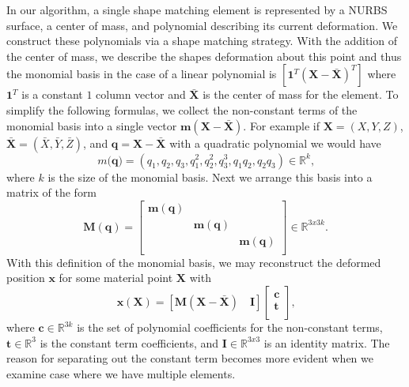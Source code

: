 In our algorithm, a single shape matching element is represented by a NURBS surface, a center of mass, and polynomial describing its current deformation. We construct these polynomials via a shape matching strategy. With the addition of the center of mass, we describe the shapes deformation about this point and thus the monomial basis in the case of a linear polynomial is $\left[ \mathbf 1^T (\mathbf{X - \bar{X}})^T \right]$ where $\mathbf 1^T$ is a constant $1$ column vector and $\mathbf{\bar{X}}$ is the center of mass for the element. To simplify the following formulas, we collect the non-constant terms of the monomial basis into a single vector $\mathbf{m}(\mathbf{X}-\mathbf{\bar{X}})$. For example if $\mathbf{X} = (X,Y,Z)$, $\mathbf{\bar{X}} = (\bar X, \bar Y, \bar Z)$, and $\mathbf{q}=\mathbf{X}-\mathbf{\bar{X}}$ with a quadratic polynomial we would have
\begin{equation}
m(\mathbf{q)} = (
					q_1, q_2, q_3,
                   	q_1^2, q_2^2, q_3^3,
                   	q_1 q_2, q_2 q_3
                ) \in \mathbb{R}^k
                \text{,}
\end{equation}
where $k$ is the size of the monomial basis. Next we arrange this basis into a matrix of the form
\begin{equation}
\mathbf{M}(\mathbf{q}) = \left[ \begin{array}{ccc}
\mathbf{m}(\mathbf{q}) &  &  \\
 & \mathbf{m}(\mathbf{q})  &  \\
 &  & \mathbf{m}(\mathbf{q})  \\
\end{array} \right] \in \mathbb{R}^{3x3k}
\text{.}
\end{equation}
With this definition of the monomial basis, we may reconstruct the deformed position $\mathbf{x}$ for some material point $\mathbf{X}$ with
\begin{equation}
\mathbf{x}(\mathbf{X}) = \left[\mathbf{M}(\mathbf{X-\bar{X}}) \quad \mathbf{I} \right]
\left[ \begin{array}{c}
\mathbf{c} \\
\mathbf{t} \\
\end{array} \right]
\text{,}
\end{equation}
where $\mathbf{c} \in \mathbb{R}^{3k}$ is the set of polynomial coefficients for the non-constant terms, $\mathbf{t} \in \mathbb{R}^3$ is the constant term coefficients, and $\mathbf{I} \in \mathbb{R}^{3x3}$ is an identity matrix. The reason for separating out the constant term becomes more evident when we examine case where we have multiple elements.

